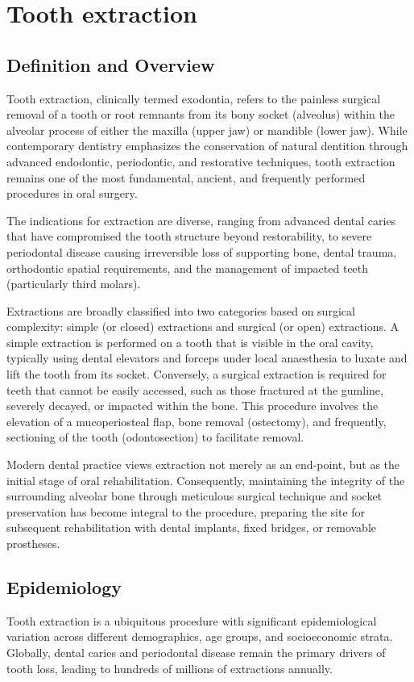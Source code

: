 \chapter{Tooth extraction}

\section*{Definition and Overview}
Tooth extraction, clinically termed exodontia, refers to the painless surgical removal of a tooth or root remnants from its bony socket (alveolus) within the alveolar process of either the maxilla (upper jaw) or mandible (lower jaw). While contemporary dentistry emphasizes the conservation of natural dentition through advanced endodontic, periodontic, and restorative techniques, tooth extraction remains one of the most fundamental, ancient, and frequently performed procedures in oral surgery.

The indications for extraction are diverse, ranging from advanced dental caries that have compromised the tooth structure beyond restorability, to severe periodontal disease causing irreversible loss of supporting bone, dental trauma, orthodontic spatial requirements, and the management of impacted teeth (particularly third molars).

Extractions are broadly classified into two categories based on surgical complexity: simple (or closed) extractions and surgical (or open) extractions. A simple extraction is performed on a tooth that is visible in the oral cavity, typically using dental elevators and forceps under local anaesthesia to luxate and lift the tooth from its socket. Conversely, a surgical extraction is required for teeth that cannot be easily accessed, such as those fractured at the gumline, severely decayed, or impacted within the bone. This procedure involves the elevation of a mucoperiosteal flap, bone removal (ostectomy), and frequently, sectioning of the tooth (odontosection) to facilitate removal.

Modern dental practice views extraction not merely as an end-point, but as the initial stage of oral rehabilitation. Consequently, maintaining the integrity of the surrounding alveolar bone through meticulous surgical technique and socket preservation has become integral to the procedure, preparing the site for subsequent rehabilitation with dental implants, fixed bridges, or removable prostheses.

\section*{Epidemiology}
Tooth extraction is a ubiquitous procedure with significant epidemiological variation across different demographics, age groups, and socioeconomic strata. Globally, dental caries and periodontal disease remain the primary drivers of tooth loss, leading to hundreds of millions of extractions annually.

